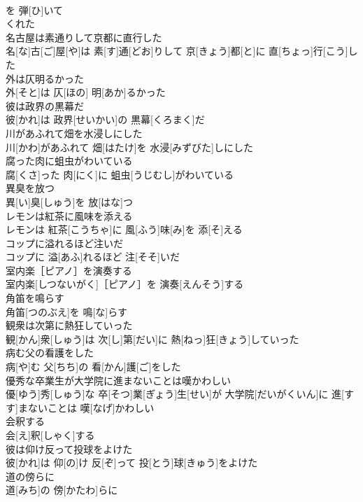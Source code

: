 \documentclass[8pt]{extreport}
\begin{document}
\begin{CJK}{UTF8}{min}
\\	を 弾[ひ]いて 
\\	くれた 
\\	名古屋は素通りして京都に直行した	
\\	名[な]古[ご]屋[や]は 素[す]通[どお]りして 京[きょう]都[と]に 直[ちょっ]行[こう]した
\\	外は仄明るかった	
\\	外[そと]は 仄[ほの] 明[あか]るかった
\\	彼は政界の黒幕だ	
\\	彼[かれ]は 政界[せいかい]の 黒幕[くろまく]だ
\\	川があふれて畑を水浸しにした	
\\	川[かわ]があふれて 畑[はたけ]を 水浸[みずびた]しにした
\\	腐った肉に蛆虫がわいている	
\\	腐[くさ]った 肉[にく]に 蛆虫[うじむし]がわいている
\\	異臭を放つ	
\\	異[い]臭[しゅう]を 放[はな]つ
\\	レモンは紅茶に風味を添える	
\\	レモンは 紅茶[こうちゃ]に 風[ふう]味[み]を 添[そ]える
\\	コップに溢れるほど注いだ	
\\	コップに 溢[あふ]れるほど 注[そそ]いだ
\\	室内楽［ピアノ］を演奏する	
\\	室内楽[しつないがく]［ピアノ］を 演奏[えんそう]する
\\	角笛を鳴らす	
\\	角笛[つのぶえ]を 鳴[な]らす
\\	観衆は次第に熱狂していった	
\\	観[かん]衆[しゅう]は 次[し]第[だい]に 熱[ねっ]狂[きょう]していった
\\	病む父の看護をした	
\\	病[や]む 父[ちち]の 看[かん]護[ご]をした
\\	優秀な卒業生が大学院に進まないことは嘆かわしい	
\\	優[ゆう]秀[しゅう]な 卒[そつ]業[ぎょう]生[せい]が 大学院[だいがくいん]に 進[すす]まないことは 嘆[なげ]かわしい
\\	会釈する	
\\	会[え]釈[しゃく]する
\\	彼は仰け反って投球をよけた	
\\	彼[かれ]は 仰[の]け 反[ぞ]って 投[とう]球[きゅう]をよけた
\\	道の傍らに	
\\	道[みち]の 傍[かたわ]らに

\end{CJK}
\end{document}
